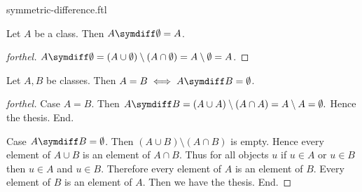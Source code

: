 \documentclass{naproche-library}
\begin{document}
\begin{smodule}{symmetric-difference.ftl}
  \begin{proposition}[forthel,id=FOUNDATIONS_03_6698730398941184]
    Let $A$ be a class.
    Then $A \symdiff \emptyset = A$.
  \end{proposition}
  \begin{proof}[forthel]
    $A \symdiff \emptyset
      = (A \cup \emptyset) \setminus (A \cap \emptyset)
      = A \setminus \emptyset
      = A$.
  \end{proof}

  \begin{proposition}[forthel,id=FOUNDATIONS_03_6111806917443584]
    Let $A, B$ be classes.
    Then $A = B \iff A \symdiff B = \emptyset$.
  \end{proposition}
  \begin{proof}[forthel]
    Case $A = B$.
      Then $A \symdiff B
        = (A \cup A) \setminus (A \cap A)
        = A \setminus A
        = \emptyset.$
      Hence the thesis.
    End.

    Case $A \symdiff B = \emptyset$.
      Then $(A \cup B) \setminus (A \cap B)$ is empty.
      Hence every element of $A \cup B$ is an element of $A \cap B$.
      Thus for all objects $u$ if $u \in A$ or $u \in B$ then $u \in A$ and $u \in B$.
      Therefore every element of $A$ is an element of $B$.
      Every element of $B$ is an element of $A$.
      Then we have the thesis.
    End.
  \end{proof}
\end{smodule}
\end{document}
